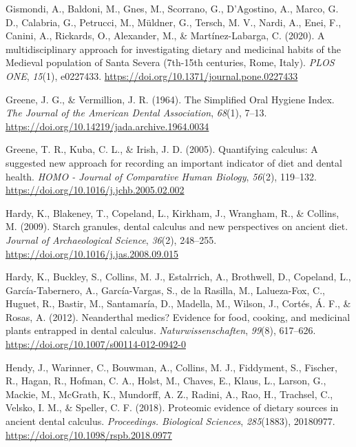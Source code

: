 \documentclass[
  b5paper,
]{book}
\newlength{\cslhangindent}
\newenvironment{CSLReferences}[2] %
 {\begin{list}{}{%
  \setlength{\itemindent}{0pt}
  \setlength{\leftmargin}{0pt}
  \setlength{\parsep}{0pt}
  \ifodd #1
   \setlength{\leftmargin}{\cslhangindent}
   \setlength{\itemindent}{-1\cslhangindent}
  \fi
  \setlength{\itemsep}{#2\baselineskip}}}
 {\end{list}}
\begin{document}
\begin{CSLReferences}{1}{0}
Gismondi, A., Baldoni, M., Gnes, M., Scorrano, G., D'Agostino, A.,
Marco, G. D., Calabria, G., Petrucci, M., Müldner, G., Tersch, M. V.,
Nardi, A., Enei, F., Canini, A., Rickards, O., Alexander, M., \&
Martínez-Labarga, C. (2020). A multidisciplinary approach for
investigating dietary and medicinal habits of the {Medieval} population
of {Santa Severa} (7th-15th centuries, {Rome}, {Italy}). \emph{PLOS
ONE}, \emph{15}(1), e0227433.
\url{https://doi.org/10.1371/journal.pone.0227433}

Greene, J. G., \& Vermillion, J. R. (1964). The {Simplified Oral Hygiene
Index}. \emph{The Journal of the American Dental Association},
\emph{68}(1), 7--13.
\url{https://doi.org/10.14219/jada.archive.1964.0034}

Greene, T. R., Kuba, C. L., \& Irish, J. D. (2005). Quantifying
calculus: {A} suggested new approach for recording an important
indicator of diet and dental health. \emph{HOMO - Journal of Comparative
Human Biology}, \emph{56}(2), 119--132.
\url{https://doi.org/10.1016/j.jchb.2005.02.002}

Hardy, K., Blakeney, T., Copeland, L., Kirkham, J., Wrangham, R., \&
Collins, M. (2009). Starch granules, dental calculus and new
perspectives on ancient diet. \emph{Journal of Archaeological Science},
\emph{36}(2), 248--255. \url{https://doi.org/10.1016/j.jas.2008.09.015}

Hardy, K., Buckley, S., Collins, M. J., Estalrrich, A., Brothwell, D.,
Copeland, L., García-Tabernero, A., García-Vargas, S., de la Rasilla,
M., Lalueza-Fox, C., Huguet, R., Bastir, M., Santamaría, D., Madella,
M., Wilson, J., Cortés, Á. F., \& Rosas, A. (2012). Neanderthal medics?
{Evidence} for food, cooking, and medicinal plants entrapped in dental
calculus. \emph{Naturwissenschaften}, \emph{99}(8), 617--626.
\url{https://doi.org/10.1007/s00114-012-0942-0}

Hendy, J., Warinner, C., Bouwman, A., Collins, M. J., Fiddyment, S.,
Fischer, R., Hagan, R., Hofman, C. A., Holst, M., Chaves, E., Klaus, L.,
Larson, G., Mackie, M., McGrath, K., Mundorff, A. Z., Radini, A., Rao,
H., Trachsel, C., Velsko, I. M., \& Speller, C. F. (2018). Proteomic
evidence of dietary sources in ancient dental calculus.
\emph{Proceedings. Biological Sciences}, \emph{285}(1883), 20180977.
\url{https://doi.org/10.1098/rspb.2018.0977}


\end{CSLReferences}
\end{document}
